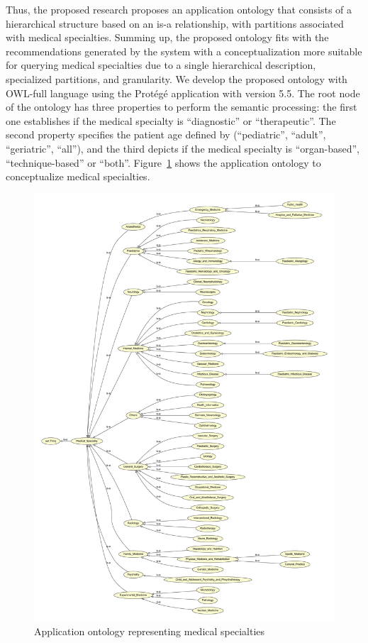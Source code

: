 \documentclass[sustainability,article,submit,pdftex,moreauthors]{Definitions/mdpi}
\begin{document}
Thus, the proposed research proposes an application ontology that consists of a hierarchical structure based on an is-a relationship, with partitions associated with medical specialties. Summing up, the proposed ontology fits with the recommendations generated by the system with a conceptualization more suitable for querying medical specialties due to a single hierarchical description, specialized partitions, and granularity. We develop the proposed ontology with OWL-full language using the Protégé application with version 5.5. The root node of the ontology has three properties to perform the semantic processing: the first one establishes if the medical specialty is “diagnostic” or “therapeutic”. The second property specifies the patient age defined by (“pediatric”, “adult”, “geriatric”, “all”), and the third depicts if the medical specialty is “organ-based”, “technique-based” or “both”. Figure~\ref{fig:ontologia} shows the application ontology to conceptualize medical specialties.

\begin{figure}
	\begin{center}
		\includegraphics[width=1.0\textwidth]{onto.pdf}
	\end{center}
	\caption{Application ontology representing medical specialties\label{fig:ontologia}}
\end{figure}
\end{document}
